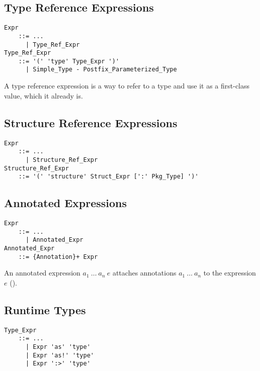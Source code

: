 \subsection{Type Reference Expressions}
\label{sec:type-ref-expressions}

\grammar\begin{lstlisting}
Expr 
    ::= ...
      | Type_Ref_Expr
Type_Ref_Expr 
    ::= '(' 'type' Type_Expr ')'
      | Simple_Type - Postfix_Parameterized_Type
\end{lstlisting}


A type reference expression is a way to refer to a type and use it as a first-class value, which it already is. 





\subsection{Structure Reference Expressions}
\label{sec:structure-ref-expressions}

\grammar\begin{lstlisting}
Expr 
    ::= ...
      | Structure_Ref_Expr
Structure_Ref_Expr 
    ::= '(' 'structure' Struct_Expr [':' Pkg_Type] ')'
\end{lstlisting}





\subsection{Annotated Expressions}
\label{sec:annotated-exprs}

\grammar\begin{lstlisting}
Expr
    ::= ...
      | Annotated_Expr
Annotated_Expr
    ::= {Annotation}+ Expr
\end{lstlisting}

An annotated expression $a_1\ \ldots\ a_n\ e$ attaches annotations $a_1\ \ldots\ a_n$ to the expression $e$ (). 






\subsection{Runtime Types}
\label{sec:runtime-types}

\grammar\begin{lstlisting}
Type_Expr
    ::= ...
      | Expr 'as' 'type'
      | Expr 'as!' 'type'
      | Expr ':>' 'type'
\end{lstlisting}

